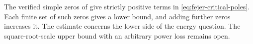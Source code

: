 The verified simple zeros of \cite{pt} give strictly positive
terms in \eqref{eq:fejer-critical-poles}. Each finite set of
such zeros gives a lower bound, and adding further zeros
increases it. The estimate concerns the lower side of the
energy question. The square-root-scale upper bound with an
arbitrary power loss remains open.
